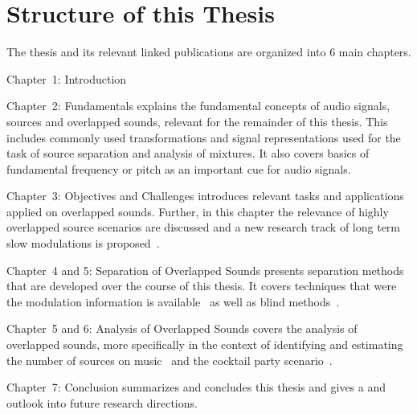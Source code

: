 \section{Structure of this Thesis}

The thesis and its relevant linked publications are organized into 6 main chapters.
\begin{description}
  \item Chapter~1: Introduction
  \item Chapter~2: Fundamentals explains the fundamental concepts of audio signals, sources and overlapped sounds, relevant for the remainder of this thesis. This includes commonly used transformations and signal representations used for the task of source separation and analysis of mixtures. It also covers basics of fundamental frequency or pitch as an important cue for audio signals.
  \item Chapter~3: Objectives and Challenges introduces relevant tasks and applications applied on overlapped sounds. Further, in this chapter the relevance of highly overlapped source scenarios are discussed and a new research track of long term slow modulations is proposed~\cite{rafii18}.
  \item Chapter~4 and 5: Separation of Overlapped Sounds presents separation methods that are developed over the course of this thesis. It covers techniques that were the modulation information is available~\cite{stoeter14, stoeter15acm, stoeter15icassp} as well as blind methods~\cite{stoeter16, liutkus17}.
  \item Chapter~5 and 6: Analysis of Overlapped Sounds covers the analysis of overlapped sounds, more specifically in the context of identifying and estimating the number of sources on music~\cite{schoeffler13, stoeter13} and the cocktail party scenario~\cite{stoeter19, stoeter18}.
  \item Chapter~7: Conclusion summarizes and concludes this thesis and gives a and outlook into future research directions.
\end{description}
